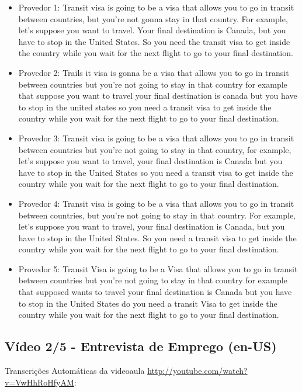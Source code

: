 \begin{itemize}
    \item Provedor 1: Transit visa is going to be a visa that allows you to go in transit between countries, but you're not gonna stay in that country. For example, let's suppose you want to travel. Your final destination is Canada, but you have to stop in the United States. So you need the transit visa to get inside the country while you wait for the next flight to go to your final destination.
    \item Provedor 2: Trails it visa is gonna be a visa that allows you to go in transit between countries but you're not going to stay in that country for example that suppose you want to travel your final destination is canada but you have to stop in the united states so you need a transit visa to get inside the country while you wait for the next flight to go to your final destination.
    \item Provedor 3: Transit visa is going to be a visa that allows you to go in transit between countries but you're not going to stay in that country, for example, let's suppose you want to travel, your final destination is Canada but you have to stop in the United States so you need a transit visa to get inside the country while you wait for the next flight to go to your final destination.
    \item Provedor 4: Transit visa is going to be a visa that allows you to go in transit between countries, but you're not going to stay in that country. For example, let's suppose you want to travel, your final destination is Canada, but you have to stop in the United States. So you need a transit visa to get inside the country while you wait for the next flight to go to your final destination.
    \item Provedor 5: Transit Visa is going to be a Visa that allows you to go in transit between countries but you're not going to stay in that country for example that supposed wants to travel your final destination is Canada but you have to stop in the United States do you need a transit Visa to get inside the country while you wait for the next flight to go to your final destination.
\end{itemize}

\subsection{Vídeo 2/5 - Entrevista de Emprego (en-US)}

\noindent
Transcrições Automáticas da videoaula \url{http://youtube.com/watch?v=VwHhRoHfyAM}:

